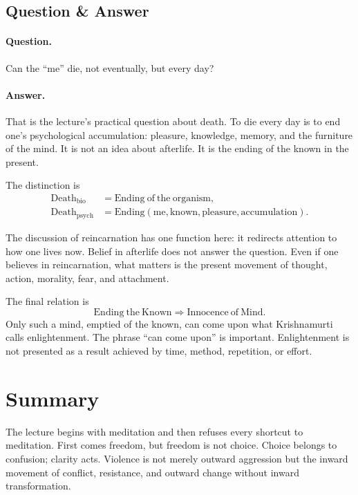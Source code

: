 \subsection{Question \& Answer}

\paragraph{Question.}
Can the ``me'' die, not eventually, but every day?

\paragraph{Answer.}
That is the lecture's practical question about death. To die every day is to end one's psychological accumulation: pleasure, knowledge, memory, and the furniture of the mind. It is not an idea about afterlife. It is the ending of the known in the present.

The distinction is
\begin{align}
\mathrm{Death}_{\mathrm{bio}}
&= \mathrm{Ending\ of\ the\ organism}, \\
\mathrm{Death}_{\mathrm{psych}}
&= \mathrm{Ending}(\mathrm{me},\mathrm{known},\mathrm{pleasure},\mathrm{accumulation}).
\end{align}

The discussion of reincarnation has one function here: it redirects attention to how one lives now. Belief in afterlife does not answer the question. Even if one believes in reincarnation, what matters is the present movement of thought, action, morality, fear, and attachment.

The final relation is
\begin{equation}
\mathrm{Ending\ the\ Known} \Rightarrow \mathrm{Innocence\ of\ Mind}.
\end{equation}
Only such a mind, emptied of the known, can come upon what Krishnamurti calls enlightenment. The phrase ``can come upon'' is important. Enlightenment is not presented as a result achieved by time, method, repetition, or effort.

\section{Summary}

The lecture begins with meditation and then refuses every shortcut to meditation. First comes freedom, but freedom is not choice. Choice belongs to confusion; clarity acts. Violence is not merely outward aggression but the inward movement of conflict, resistance, and outward change without inward transformation.

